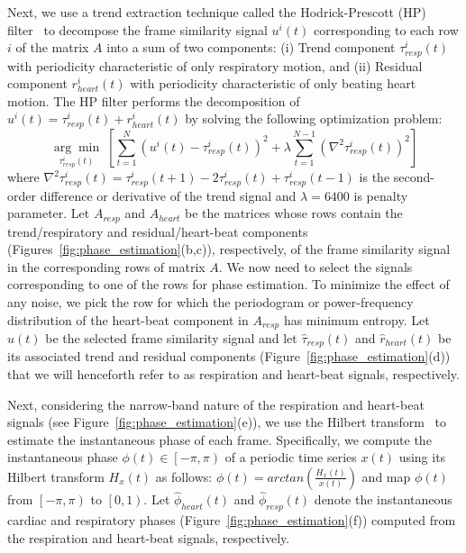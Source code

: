 \documentclass[runningheads,a4paper]{llncs}
\newcommand{\argmin}[1]{\underset{#1}{\operatorname{arg}\operatorname{min}}\;}
\begin{document}
	Next, we use a trend extraction technique called the Hodrick-Prescott (HP) filter~\cite{Alexandrov2012} to decompose the frame similarity signal $u^i(t)$ corresponding to each row $i$ of the matrix $A$ into a sum of two components: (i) Trend component $\tau^i_{resp}(t)$ with periodicity characteristic of only respiratory motion, and (ii) Residual component $r^i_{heart}(t)$ with periodicity characteristic of only beating heart motion. The HP filter performs the decomposition of $u^i(t) = \tau^i_{resp}(t) + r^i_{heart}(t)$ by solving the following optimization problem:
\begin{equation}	
\argmin{\tau^i_{resp}(t)} \left[ \sum_{t=1}^{N}  \left(u^i(t) - \tau^i_{resp}(t) \right)^2  + \lambda \sum_{t=1}^{N-1} \left( \nabla^2 \tau^i_{resp}(t) \right)^2 \right] 
\end{equation}
where $\nabla^2\tau^i_{resp}(t) = \tau^i_{resp}(t+1) - 2 \tau^i_{resp}(t) + \tau^i_{resp}(t-1)$ is the second-order difference or derivative of the trend signal and $\lambda=6400$ is penalty parameter. Let $A_{resp}$ and $A_{heart}$ be the matrices whose rows contain the trend/respiratory and residual/heart-beat components (Figures~\ref{fig:phase_estimation}(b,c)), respectively, of the frame similarity signal in the corresponding rows of matrix $A$. We now need to select the signals corresponding to one of the rows for phase estimation. To minimize the effect of any noise, we pick the row for which the periodogram or power-frequency distribution of the heart-beat component in $A_{resp}$ has minimum entropy. Let $\hat{u}(t)$ be the selected frame similarity signal and let $\hat{\tau}_{resp}(t)$ and $\hat{r}_{heart}(t)$  be its associated trend and residual components  (Figure~\ref{fig:phase_estimation}(d)) that we will henceforth refer to as respiration and heart-beat signals, respectively.

	Next, considering the narrow-band nature of the respiration and heart-beat signals (see  Figure~\ref{fig:phase_estimation}(e)), we use the Hilbert transform~\cite{Boashash1992} to estimate the instantaneous phase of each frame. Specifically, we compute the instantaneous phase $\phi(t) \in \left [  -\pi, \pi\right )$ of a periodic time series $x(t)$ using its Hilbert transform $H_x(t)$ as follows: $\phi(t) = arctan \left( \frac{H_x(t)}{x(t)}\right)$ and map $\phi(t)$ from $\left [  -\pi, \pi\right )$ to $\left [  0, 1\right )$. Let $\hat{\phi}_{heart}(t)$ and $\hat{\phi}_{resp}(t)$ denote the instantaneous cardiac and respiratory phases (Figure~\ref{fig:phase_estimation}(f)) computed from the respiration and heart-beat signals, respectively.
%
\vspace{-0.3cm}
\end{document}
